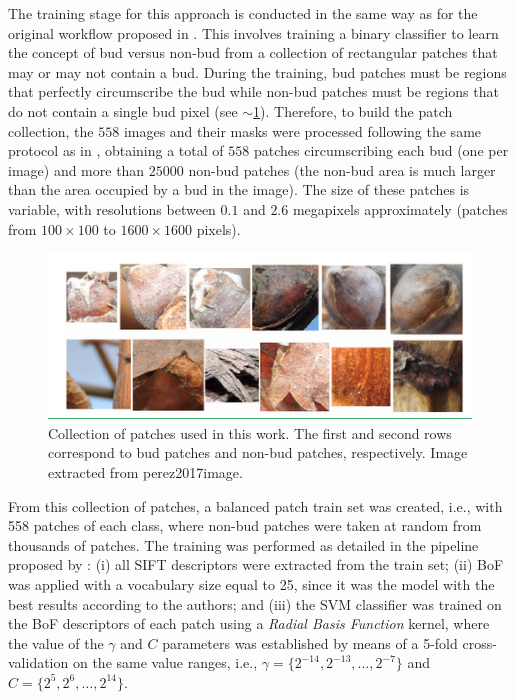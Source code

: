 \documentclass[a4paper,authoryear,review]{elsarticle}
\begin{document}
The training stage for this approach is conducted in the same way as for the original workflow proposed in \citet{perez2017image}. This involves training a binary classifier to learn the concept of bud versus non-bud from a collection of rectangular patches that may or may not contain a bud. During the training, bud patches must be regions that perfectly circumscribe the bud while non-bud patches must be regions that do not contain a single bud pixel (see $\sim$\ref{fig:Figure2}). Therefore, to build the patch collection, the $558$ images and their masks were processed following the same protocol as in \citet{perez2017image}, obtaining a total of  $558$ patches circumscribing each bud (one per image) and more than $25000$ non-bud patches (the non-bud area is much larger than the area occupied by a bud in the image). The size of these patches is variable, with resolutions between $0.1$ and $2.6$ megapixels approximately (patches from $100 \times 100$ to $1600 \times 1600$ pixels).


\begin{figure}
    \centering
    \includegraphics[width=12cm]{figures/Figure2.png}
    \caption{
Collection of patches used in this work. The first and second rows correspond to bud patches and non-bud patches, respectively. Image extracted from {perez2017image}.
    }
    \label{fig:Figure2}
\end{figure}


From this collection of patches, a balanced patch train set was created, i.e., with 558 patches of each class, where non-bud patches were taken at random from thousands of patches. The training was performed as detailed in the pipeline proposed by \citet{perez2017image}: (i) all SIFT descriptors were extracted from the train set; (ii) BoF was applied with a vocabulary size equal to 25, since it was the model with the best results according to the authors; and (iii) the SVM classifier was trained on the BoF descriptors of each patch using a \emph{Radial Basis Function} kernel, where the value of the $\gamma$ and $C$ parameters was established by means of a 5-fold cross-validation on the same value ranges, i.e., $\gamma = \{2^{-14}, 2^{-13}, \ldots, 2^{-7}\}$ and $C = \{2^{5}, 2^{6},\ldots , 2^{14}\}$.
\end{document}
